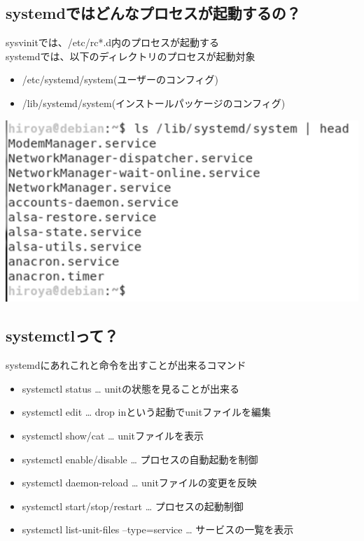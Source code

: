 \documentclass[mingoth,a4paper]{jsarticle}
\begin{document}
\subsection{systemdではどんなプロセスが起動するの？}

sysvinitでは、/etc/rc*.d内のプロセスが起動する\\
systemdでは、以下のディレクトリのプロセスが起動対象
\begin{itemize}
 \item /etc/systemd/system(ユーザーのコンフィグ)
 \item /lib/systemd/system(インストールパッケージのコンフィグ)
\end{itemize}
\includegraphics[keepaspectratio,width=0.5\hsize]{image201905-kansai/systemdsystem01_gray.png}

\subsection{systemctlって？}

systemdにあれこれと命令を出すことが出来るコマンド
\begin{itemize}
 \item systemctl status … unitの状態を見ることが出来る
 \item systemctl edit … drop inという起動でunitファイルを編集
 \item systemctl show/cat … unitファイルを表示
 \item systemctl enable/disable … プロセスの自動起動を制御
 \item systemctl daemon-reload … unitファイルの変更を反映
 \item systemctl start/stop/restart … プロセスの起動制御
 \item systemctl list-unit-files --type=service … サービスの一覧を表示
\end{itemize}
\end{document}
